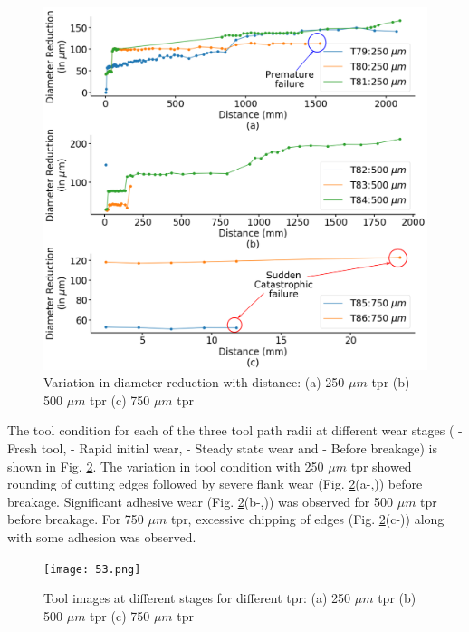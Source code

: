 \documentclass[preprint,review,12pt]{elsarticle}
\newcommand{\RomanNumeralCaps}[1]
    {\MakeUppercase{\romannumeral #1}}
\begin{document}
\begin{figure}[!h]
  \begin{center}
    \includegraphics[width=\linewidth]{52.png}
    \caption{Variation in diameter reduction with distance: (a) 250 $\mu{m}$ tpr (b) 500 $\mu{m}$ tpr (c) 750 $\mu{m}$ tpr}\label{fig:fig52}
  \end{center}
\end{figure}

The tool condition for each of the three tool path radii at different wear stages (\RomanNumeralCaps{1} - Fresh tool, \RomanNumeralCaps{2} - Rapid initial wear, \RomanNumeralCaps{3} - Steady state wear and \RomanNumeralCaps{4} - Before breakage) is shown in Fig. \ref{fig:fig53}. The variation in tool condition with 250 $\mu{m}$ tpr  showed rounding of cutting edges followed by severe flank wear (Fig. \ref{fig:fig53}(a-\RomanNumeralCaps{2},\RomanNumeralCaps{3})) before breakage. Significant adhesive wear (Fig. \ref{fig:fig53}(b-\RomanNumeralCaps{2},\RomanNumeralCaps{4})) was observed for 500 $\mu{m}$ tpr before breakage. For 750 $\mu{m}$ tpr, excessive chipping of edges (Fig. \ref{fig:fig53}(c-\RomanNumeralCaps{2})) along with some adhesion was observed.

\begin{figure}[!h]
  \begin{center}
    \texttt{[image: 53.png]}
    \caption{Tool images at different stages for different tpr: (a) 250 $\mu{m}$ tpr (b) 500 $\mu{m}$ tpr (c) 750 $\mu{m}$ tpr}\label{fig:fig53}
  \end{center}
\end{figure}
\end{document}
